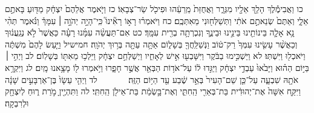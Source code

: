 \documentclass[twoside, openany, parskip=half, 11pt]{book}
\begin{document}
כו וַאֲבִימֶ֕לֶךְ הָלַ֥ךְ אֵלָ֖יו מִגְּרָ֑ר וַאֲחֻזַּת֙ מֵֽרֵעֵ֔הוּ וּפִיכֹ֖ל שַׂר־צְבָאֽוֹ׃ כז וַיֹּ֤אמֶר אֲלֵהֶם֙ יִצְחָ֔ק מַדּ֖וּעַ בָּאתֶ֣ם אֵלָ֑י וְאַתֶּם֙ שְׂנֵאתֶ֣ם אֹתִ֔י וַתְּשַׁלְּח֖וּנִי מֵאִתְּכֶֽם׃ כח וַיֹּאמְר֗וּ רָא֣וֹ רָאִ֘ינוּ֮ כִּֽי־הָיָ֣ה יְהֹוָ֣ה ׀ עִמָּךְ֒ וַנֹּ֗אמֶר תְּהִ֨י נָ֥א אָלָ֛ה בֵּינוֹתֵ֖ינוּ בֵּינֵ֣ינוּ וּבֵינֶ֑ךָ וְנִכְרְתָ֥ה בְרִ֖ית עִמָּֽךְ׃ כט אִם־תַּעֲשֵׂ֨ה עִמָּ֜נוּ רָעָ֗ה כַּאֲשֶׁר֙ לֹ֣א נְגַֽעֲנ֔וּךָ וְכַאֲשֶׁ֨ר עָשִׂ֤ינוּ עִמְּךָ֙ רַק־ט֔וֹב וַנְּשַׁלֵּֽחֲךָ֖ בְּשָׁל֑וֹם אַתָּ֥ה עַתָּ֖ה בְּר֥וּךְ יְהֹוָֽה׃ חמישיל וַיַּ֤עַשׂ לָהֶם֙ מִשְׁתֶּ֔ה וַיֹּאכְל֖וּ וַיִּשְׁתּֽוּ׃ לא וַיַּשְׁכִּ֣ימוּ בַבֹּ֔קֶר וַיִּשָּׁבְע֖וּ אִ֣ישׁ לְאָחִ֑יו וַיְשַׁלְּחֵ֣ם יִצְחָ֔ק וַיֵּלְכ֥וּ מֵאִתּ֖וֹ בְּשָׁלֽוֹם׃ לב וַיְהִ֣י ׀ בַּיּ֣וֹם הַה֗וּא וַיָּבֹ֙אוּ֙ עַבְדֵ֣י יִצְחָ֔ק וַיַּגִּ֣דוּ ל֔וֹ עַל־אֹד֥וֹת הַבְּאֵ֖ר אֲשֶׁ֣ר חָפָ֑רוּ וַיֹּ֥אמְרוּ ל֖וֹ מָצָ֥אנוּ מָֽיִם׃ לג וַיִּקְרָ֥א אֹתָ֖הּ שִׁבְעָ֑ה עַל־כֵּ֤ן שֵׁם־הָעִיר֙ בְּאֵ֣ר שֶׁ֔בַע עַ֖ד הַיּ֥וֹם הַזֶּֽה׃
　　　 לד וַיְהִ֤י עֵשָׂו֙ בֶּן־אַרְבָּעִ֣ים שָׁנָ֔ה וַיִּקַּ֤ח אִשָּׁה֙ אֶת־יְהוּדִ֔ית בַּת־בְּאֵרִ֖י הַֽחִתִּ֑י וְאֶת־בָּ֣שְׂמַ֔ת בַּת־אֵילֹ֖ן הַֽחִתִּֽי׃ לה וַתִּהְיֶ֖יןָ מֹ֣רַת ר֑וּחַ לְיִצְחָ֖ק וּלְרִבְקָֽה׃
\end{document}
